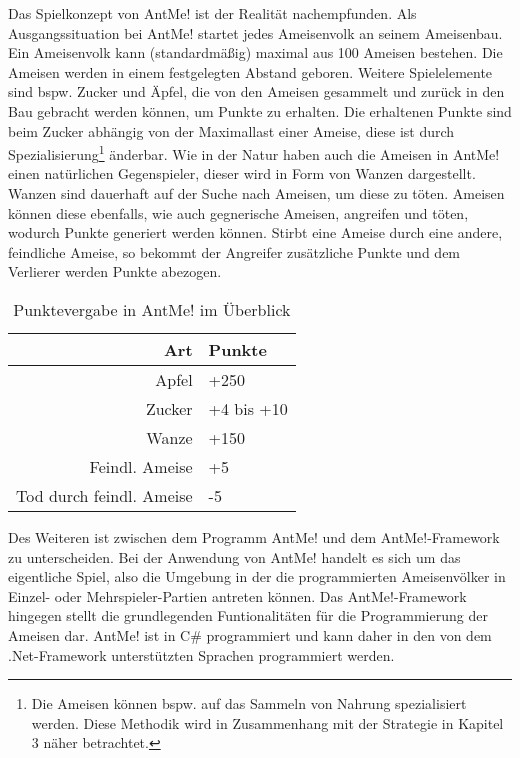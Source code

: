 Das Spielkonzept von AntMe! ist der Realität nachempfunden. Als Ausgangssituation bei AntMe! startet jedes Ameisenvolk an seinem Ameisenbau. Ein Ameisenvolk kann (standardmäßig) maximal aus 100 Ameisen bestehen. Die Ameisen werden in einem festgelegten Abstand geboren. Weitere Spielelemente sind bspw. Zucker und Äpfel, die von den Ameisen gesammelt und zurück in den Bau gebracht werden können, um Punkte zu erhalten. Die erhaltenen Punkte sind beim Zucker abhängig von der Maximallast einer Ameise, diese ist durch Spezialisierung\footnote{Die Ameisen können bspw. auf das Sammeln von Nahrung spezialisiert werden. Diese Methodik wird in Zusammenhang mit der Strategie in Kapitel 3 näher betrachtet.} änderbar. Wie in der Natur haben auch die Ameisen in AntMe! einen natürlichen Gegenspieler, dieser wird in Form von Wanzen dargestellt. Wanzen sind dauerhaft auf der Suche nach Ameisen, um diese zu töten. Ameisen können diese ebenfalls, wie auch gegnerische Ameisen, angreifen und töten, wodurch Punkte generiert werden können. Stirbt eine Ameise durch eine andere, feindliche Ameise, so bekommt der Angreifer zusätzliche Punkte und dem Verlierer werden Punkte abezogen.

\begin{table}[hbt]
\centering
\begin{minipage}[t]{.6\textwidth} %
\caption{Punktevergabe in AntMe! im Überblick} %
\begin{tabularx}{\columnwidth}{rX}
\toprule
Art & Punkte\\
\midrule
Apfel & +250\\
Zucker & +4 bis +10\\
Wanze & +150\\
Feindl. Ameise & +5\\
Tod durch feindl. Ameise & -5\\
\bottomrule
\end{tabularx}
\label{tab:points}
\end{minipage}
\end{table}

Des Weiteren ist zwischen dem Programm AntMe! und dem AntMe!-Framework zu unterscheiden. Bei der Anwendung von AntMe! handelt es sich um das eigentliche Spiel, also die Umgebung in der die programmierten Ameisenvölker in Einzel- oder Mehrspieler-Partien antreten können. Das AntMe!-Framework hingegen stellt die grundlegenden Funtionalitäten für die Programmierung der Ameisen dar. AntMe! ist in C\# programmiert und kann daher in den von dem .Net-Framework unterstützten Sprachen programmiert werden.